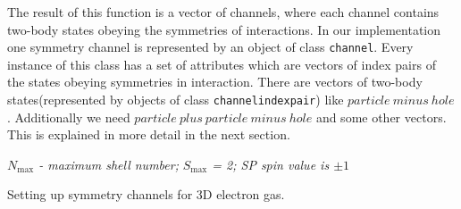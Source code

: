 \documentclass[twoside,english]{uiofysmaster}
\newcommand{\classname}[1]{\texttt{#1}}
\begin{document}
The result of this function is a vector of channels, where each channel contains two-body states obeying the symmetries of interactions.
In our implementation one symmetry channel is represented by an object of class \classname{channel}. Every instance of this class has a set of attributes which are vectors of index pairs of the states obeying symmetries in interaction.  
There are vectors of two-body states(represented by objects of class \classname{channelindexpair}) like ${particle\ minus\ hole}$. Additionally we need ${particle\ plus\ particle\ minus\ hole}$ and some other vectors. This is explained in more detail in the next section. 
\IncMargin{1em}
\begin{algorithm}[h!]
	\SetAlgoLined
	
	\BlankLine
	\emph{$N_{\mathrm{max}}$ - maximum shell number;}\;
	\emph{$S_{\mathrm{max}}$ = 2; SP spin value is $\pm 1$}\;
	\For{$N_x\leftarrow -N_{\mathrm{max}}$ \KwTo $N_{\mathrm{max}}$}{
		\For{$N_y\leftarrow -N_{\mathrm{max}}$ \KwTo $N_{\mathrm{max}}$}{  %
			\For{$N_z\leftarrow -N_{\mathrm{max}}$ \KwTo $N_{\mathrm{max}}$}{
				\For{$S\leftarrow -S_{\mathrm{max}}$ \KwTo $S_{\mathrm{max}}$}{
					Create channel\\
					
					\For{$i\leftarrow 1$ \KwTo $N_{\mathrm{Fermi}}$}{
						\For{$j\leftarrow 1$ \KwTo $N_{\mathrm{Fermi}}$}{
							
							\If{$N_x,N_y,N_z,S$ $\mathrm{of\ state}$ $(i+j)$ = $N_x,N_y,N_z,S$}
							{add i,j to HoleHole vector}
						}
					}
					add HoleHole vector to Channel\\
					\For{$i\leftarrow 1$ \KwTo $N_{\mathrm{Fermi}}$}{
						\For{$a\leftarrow N_{\mathrm{Fermi}}$ \KwTo $N_{\mathrm{States}}$}{
							
							\If{$N_x,N_y,N_z,S$ $\mathrm{of\ state}$ $(i+a)$ = $N_x,N_y,N_z,S$}
							{add i,a to ParticleHole vector}
						}
					}					
					add ParticleHole vector to Channel\\
					$\dots$\\
					add ParticleParticle vector to Channel\\
					add HoleParticle vector to Channel\\
					add ParticleMinusHole vector to Channel\\
					add HoleMinusParticle vector to Channel\\
					
					
				}
			}
		}
	}
	\caption{Setting up symmetry channels for 3D electron gas.}\label{CCSetUpChannels}
\end{algorithm}\DecMargin{1em}
\end{document}
